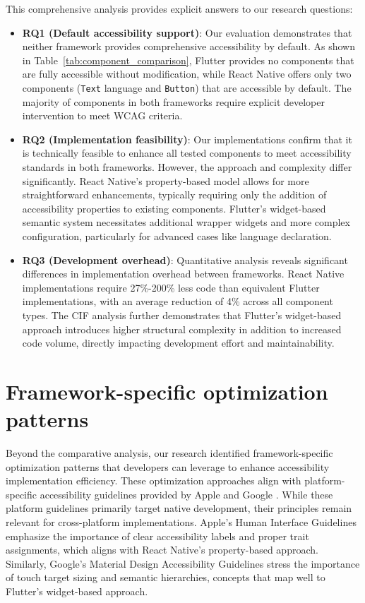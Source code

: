{This comprehensive analysis provides explicit answers to our research questions:

\begin{itemize}
    \item \textbf{RQ1 (Default accessibility support)}: Our evaluation demonstrates that neither framework provides comprehensive accessibility by default. As shown in Table~\ref{tab:component_comparison}, Flutter provides no components that are fully accessible without modification, while React Native offers only two components (\texttt{Text} language and \texttt{Button}) that are accessible by default. The majority of components in both frameworks require explicit developer intervention to meet WCAG criteria.

    \item \textbf{RQ2 (Implementation feasibility)}: Our implementations confirm that it is technically feasible to enhance all tested components to meet accessibility standards in both frameworks. However, the approach and complexity differ significantly. React Native's property-based model allows for more straightforward enhancements, typically requiring only the addition of accessibility properties to existing components. Flutter's widget-based semantic system necessitates additional wrapper widgets and more complex configuration, particularly for advanced cases like language declaration.

    \item \textbf{RQ3 (Development overhead)}: Quantitative analysis reveals significant differences in implementation overhead between frameworks. React Native implementations require 27\%-200\% less code than equivalent Flutter implementations, with an average reduction of 4\% across all component types. The CIF analysis further demonstrates that Flutter's widget-based approach introduces higher structural complexity in addition to increased code volume, directly impacting development effort and maintainability.
\end{itemize}

\section{Framework-specific optimization patterns}
\label{sec:optimization-patterns}

Beyond the comparative analysis, our research identified framework-specific optimization patterns that developers can leverage to enhance accessibility implementation efficiency. 
These optimization approaches align with platform-specific accessibility guidelines provided by Apple \cite{apple-accessibility} and Google \cite{google-accessibility}. While these platform guidelines primarily target native development, their principles remain relevant for cross-platform implementations. Apple's Human Interface Guidelines emphasize the importance of clear accessibility labels and proper trait assignments, which aligns with React Native's property-based approach. Similarly, Google's Material Design Accessibility Guidelines stress the importance of touch target sizing and semantic hierarchies, concepts that map well to Flutter's widget-based approach.

}
